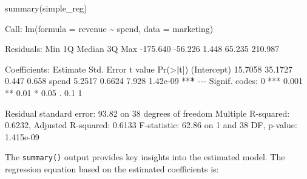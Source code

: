 \documentclass[
  11pt,
]{book}
\makeatletter
\newenvironment{Shaded}{}{}
\newcommand{\AttributeTok}[1]{#1}
\newcommand{\DecValTok}[1]{#1}
\newcommand{\ErrorTok}[1]{\textcolor[rgb]{0.21,0.21,0.21}{\textbf{#1}}}
\newcommand{\FloatTok}[1]{#1}
\newcommand{\FunctionTok}[1]{#1}
\newcommand{\NormalTok}[1]{#1}
\newcommand{\SpecialCharTok}[1]{\textcolor[rgb]{0.39,0.39,0.39}{#1}}
\newcommand{\StringTok}[1]{\textcolor[rgb]{0.39,0.39,0.39}{#1}}
\newenvironment{kframe}{%
\medskip{}
\setlength{\fboxsep}{.8em}
 \def\at@end@of@kframe{}%
 \ifinner\ifhmode%
  \def\at@end@of@kframe{\end{minipage}}%
  \begin{minipage}{\columnwidth}%
 \fi\fi%
 \def\FrameCommand##1{\hskip\@totalleftmargin \hskip-\fboxsep
 \colorbox{shadecolor}{##1}\hskip-\fboxsep
     \hskip-\linewidth \hskip-\@totalleftmargin \hskip\columnwidth}%
 \MakeFramed {\advance\hsize-\width
   \@totalleftmargin\z@ \linewidth\hsize
   \@setminipage}}%
 {\par\unskip\endMakeFramed%
 \at@end@of@kframe}
\renewenvironment{Shaded}{\begin{kframe}}{\end{kframe}}
\theoremstyle{definition}
\theoremstyle{definition}
\theoremstyle{definition}
\theoremstyle{definition}
\theoremstyle{remark}
\makeatother
\begin{document}
\begin{Shaded}
\begin{Highlighting}[]
\FunctionTok{summary}\NormalTok{(simple\_reg)}
   
\NormalTok{   Call}\SpecialCharTok{:}
   \FunctionTok{lm}\NormalTok{(}\AttributeTok{formula =}\NormalTok{ revenue }\SpecialCharTok{\textasciitilde{}}\NormalTok{ spend, }\AttributeTok{data =}\NormalTok{ marketing)}
   
\NormalTok{   Residuals}\SpecialCharTok{:}
\NormalTok{        Min       }\DecValTok{1}\NormalTok{Q   Median       }\DecValTok{3}\NormalTok{Q      Max }
   \SpecialCharTok{{-}}\FloatTok{175.640}  \SpecialCharTok{{-}}\FloatTok{56.226}    \FloatTok{1.448}   \FloatTok{65.235}  \FloatTok{210.987} 
   
\NormalTok{   Coefficients}\SpecialCharTok{:}
\NormalTok{               Estimate Std. Error t value }\FunctionTok{Pr}\NormalTok{(}\SpecialCharTok{\textgreater{}}\ErrorTok{|}\NormalTok{t}\SpecialCharTok{|}\NormalTok{)    }
\NormalTok{   (Intercept)  }\FloatTok{15.7058}    \FloatTok{35.1727}   \FloatTok{0.447}    \FloatTok{0.658}    
\NormalTok{   spend         }\FloatTok{5.2517}     \FloatTok{0.6624}   \FloatTok{7.928} \FloatTok{1.42e{-}09} \SpecialCharTok{**}\ErrorTok{*}
   \SpecialCharTok{{-}{-}{-}}
\NormalTok{   Signif. codes}\SpecialCharTok{:}  \DecValTok{0} \StringTok{\textquotesingle{}***\textquotesingle{}} \FloatTok{0.001} \StringTok{\textquotesingle{}**\textquotesingle{}} \FloatTok{0.01} \StringTok{\textquotesingle{}*\textquotesingle{}} \FloatTok{0.05} \StringTok{\textquotesingle{}.\textquotesingle{}} \FloatTok{0.1} \StringTok{\textquotesingle{} \textquotesingle{}} \DecValTok{1}
   
\NormalTok{   Residual standard error}\SpecialCharTok{:} \FloatTok{93.82}\NormalTok{ on }\DecValTok{38}\NormalTok{ degrees of freedom}
\NormalTok{   Multiple R}\SpecialCharTok{{-}}\NormalTok{squared}\SpecialCharTok{:}  \FloatTok{0.6232}\NormalTok{, Adjusted R}\SpecialCharTok{{-}}\NormalTok{squared}\SpecialCharTok{:}  \FloatTok{0.6133} 
\NormalTok{   F}\SpecialCharTok{{-}}\NormalTok{statistic}\SpecialCharTok{:} \FloatTok{62.86}\NormalTok{ on }\DecValTok{1}\NormalTok{ and }\DecValTok{38}\NormalTok{ DF,  p}\SpecialCharTok{{-}}\NormalTok{value}\SpecialCharTok{:} \FloatTok{1.415e{-}09}
\end{Highlighting}
\end{Shaded}

The \texttt{summary()} output provides key insights into the estimated model. The regression equation based on the estimated coefficients is:
\end{document}
